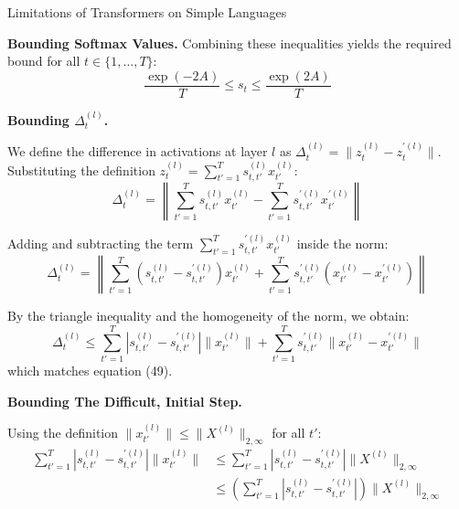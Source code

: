\begin{question}{Limitations of Transformers on Simple Languages}
\begin{subquestion}{\textbf{Bounding Softmax Values.}}
    Combining these inequalities yields the required bound for all $t \in \{1, \dots, T\}$:
    \begin{equation}
    \frac{\exp(-2A)}{T} \le s_t \le \frac{\exp(2A)}{T}
    \end{equation}
\end{subquestion}

\begin{subquestion}{\textbf{Bounding $\Delta_t^{(l)}$.}}

    We define the difference in activations at layer $l$ as $\Delta_t^{(l)} = \|z_t^{(l)} - z_t^{\prime(l)}\|$. 
    Substituting the definition $z_t^{(l)} = \sum_{t'=1}^{T} s_{t,t'}^{(l)} x_{t'}^{(l)}$:
    \begin{equation}
    \Delta_t^{(l)} = \left\| \sum_{t'=1}^{T} s_{t,t'}^{(l)} x_{t'}^{(l)} - \sum_{t'=1}^{T} s_{t,t'}^{\prime(l)} x_{t'}^{\prime(l)} \right\|
    \end{equation}

    Adding and subtracting the term $\sum_{t'=1}^{T} s_{t,t'}^{\prime(l)} x_{t'}^{(l)}$ inside the norm:
    \begin{equation}
    \Delta_t^{(l)} = \left\| \sum_{t'=1}^{T} (s_{t,t'}^{(l)} - s_{t,t'}^{\prime(l)}) x_{t'}^{(l)} + \sum_{t'=1}^{T} s_{t,t'}^{\prime(l)} (x_{t'}^{(l)} - x_{t'}^{\prime(l)}) \right\|
    \end{equation}

    By the triangle inequality and the homogeneity of the norm, we obtain:
    \begin{equation}
    \Delta_t^{(l)} \le \sum_{t'=1}^{T} |s_{t,t'}^{(l)} - s_{t,t'}^{\prime(l)}| \|x_{t'}^{(l)}\| + \sum_{t'=1}^{T} s_{t,t'}^{\prime(l)} \|x_{t'}^{(l)} - x_{t'}^{\prime(l)}\|
    \end{equation}
    which matches equation (49).
\end{subquestion}

\begin{subquestion}{\textbf{Bounding The Difficult, Initial Step.}}

    Using the definition $\|x_{t'}^{(l)}\| \le \|X^{(l)}\|_{2,\infty}$ for all $t'$:
    \begin{align*}
        \sum_{t'=1}^{T} |s_{t,t'}^{(l)} - s_{t,t'}^{\prime(l)}| \|x_{t'}^{(l)}\| &\le \sum_{t'=1}^{T} |s_{t,t'}^{(l)} - s_{t,t'}^{\prime(l)}| \|X^{(l)}\|_{2,\infty} \\
        &\le \left( \sum_{t'=1}^{T} |s_{t,t'}^{(l)} - s_{t,t'}^{\prime(l)}| \right) \|X^{(l)}\|_{2,\infty}
    \end{align*}
\end{subquestion}


\end{question}
